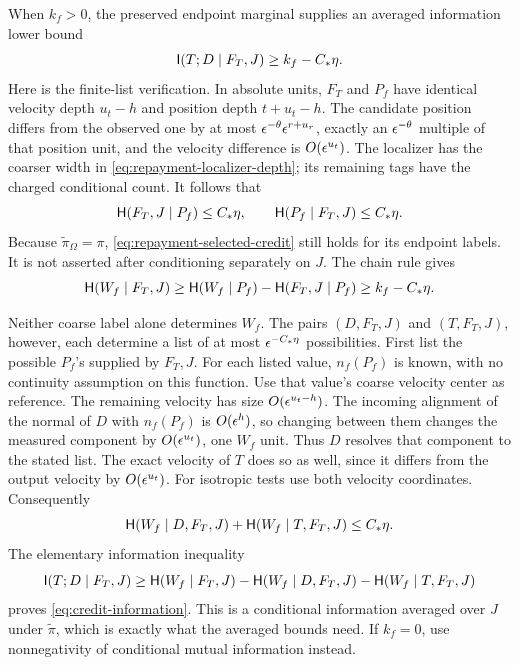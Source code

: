 When \(k_f>0\), the preserved endpoint marginal supplies an
averaged information lower bound
\begin{equation}
 \mathsf I(T;D\mid F_T,J)\ge k_f-C_*\eta .
 \label{eq:credit-information}
\end{equation}
Here is the finite-list verification.  In absolute units,
\(F_T\) and \(P_f\) have identical velocity depth \(u_t-h\)
and position depth \(t+u_t-h\).  The candidate position differs
from the observed one by at most
\(\epsilon^{-\theta}\epsilon^{r+u_r}\), exactly an
\(\epsilon^{-\theta}\) multiple of that position unit, and the
velocity difference is \(O(\epsilon^{u_t})\).
The localizer has the coarser width in
\eqref{eq:repayment-localizer-depth}; its remaining tags have the
charged conditional count.  It follows that
\[
 \mathsf H(F_T,J\mid P_f)\le C_*\eta,\qquad
 \mathsf H(P_f\mid F_T,J)\le C_*\eta .
\]
Because \(\widetilde\pi_\Omega=\pi\),
\eqref{eq:repayment-selected-credit} still holds for its endpoint
labels.  It is not asserted after conditioning separately on \(J\).
The chain rule gives
\[
 \mathsf H(W_f\mid F_T,J)
 \ge \mathsf H(W_f\mid P_f)-\mathsf H(F_T,J\mid P_f)
 \ge k_f-C_*\eta .
\]

Neither coarse label alone determines \(W_f\).  The pairs
\((D,F_T,J)\) and \((T,F_T,J)\), however, each determine a
list of at most \(\epsilon^{-C_*\eta}\) possibilities.
First list the possible \(P_f\)'s supplied by \(F_T,J\).
For each listed value, \(n_f(P_f)\) is known, with no continuity
assumption on this function.  Use that value's coarse velocity center
as reference.  The remaining velocity has size
\(O(\epsilon^{u_t-h})\).  The incoming alignment of the normal of
\(D\) with \(n_f(P_f)\) is \(O(\epsilon^h)\), so changing between
them changes the measured component by \(O(\epsilon^{u_t})\), one
\(W_f\) unit.  Thus \(D\) resolves that component to the stated
list.  The exact velocity of \(T\) does so as well, since it differs
from the output velocity by \(O(\epsilon^{u_t})\).
For isotropic tests use both velocity coordinates.  Consequently
\[
 \mathsf H(W_f\mid D,F_T,J)+\mathsf H(W_f\mid T,F_T,J)\le C_*\eta .
\]
The elementary information inequality
\[
 \mathsf I(T;D\mid F_T,J)\ge
 \mathsf H(W_f\mid F_T,J)-\mathsf H(W_f\mid D,F_T,J)
                         -\mathsf H(W_f\mid T,F_T,J)
\]
proves \eqref{eq:credit-information}.  This is a conditional
information averaged over \(J\) under \(\widetilde\pi\), which is
exactly what the averaged bounds need.  If \(k_f=0\), use
nonnegativity of conditional mutual information instead.

